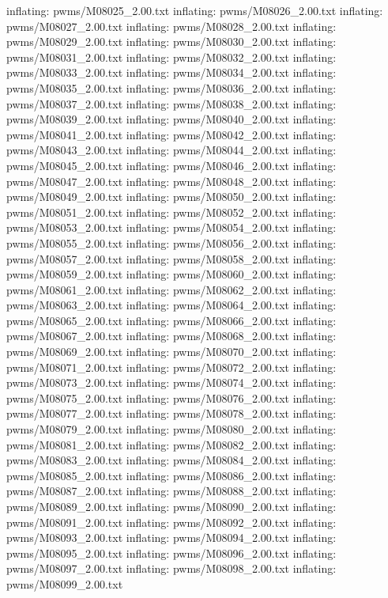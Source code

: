 \documentclass[letterpaper,10pt,english]{sphinxmanual}
\begin{document}
{\begin{sphinxVerbatim}[commandchars=\\\{\}]
  inflating: pwms/M08025\_2.00.txt
  inflating: pwms/M08026\_2.00.txt
  inflating: pwms/M08027\_2.00.txt
  inflating: pwms/M08028\_2.00.txt
  inflating: pwms/M08029\_2.00.txt
  inflating: pwms/M08030\_2.00.txt
  inflating: pwms/M08031\_2.00.txt
  inflating: pwms/M08032\_2.00.txt
  inflating: pwms/M08033\_2.00.txt
  inflating: pwms/M08034\_2.00.txt
  inflating: pwms/M08035\_2.00.txt
  inflating: pwms/M08036\_2.00.txt
  inflating: pwms/M08037\_2.00.txt
  inflating: pwms/M08038\_2.00.txt
  inflating: pwms/M08039\_2.00.txt
  inflating: pwms/M08040\_2.00.txt
  inflating: pwms/M08041\_2.00.txt
  inflating: pwms/M08042\_2.00.txt
  inflating: pwms/M08043\_2.00.txt
  inflating: pwms/M08044\_2.00.txt
  inflating: pwms/M08045\_2.00.txt
  inflating: pwms/M08046\_2.00.txt
  inflating: pwms/M08047\_2.00.txt
  inflating: pwms/M08048\_2.00.txt
  inflating: pwms/M08049\_2.00.txt
  inflating: pwms/M08050\_2.00.txt
  inflating: pwms/M08051\_2.00.txt
  inflating: pwms/M08052\_2.00.txt
  inflating: pwms/M08053\_2.00.txt
  inflating: pwms/M08054\_2.00.txt
  inflating: pwms/M08055\_2.00.txt
  inflating: pwms/M08056\_2.00.txt
  inflating: pwms/M08057\_2.00.txt
  inflating: pwms/M08058\_2.00.txt
  inflating: pwms/M08059\_2.00.txt
  inflating: pwms/M08060\_2.00.txt
  inflating: pwms/M08061\_2.00.txt
  inflating: pwms/M08062\_2.00.txt
  inflating: pwms/M08063\_2.00.txt
  inflating: pwms/M08064\_2.00.txt
  inflating: pwms/M08065\_2.00.txt
  inflating: pwms/M08066\_2.00.txt
  inflating: pwms/M08067\_2.00.txt
  inflating: pwms/M08068\_2.00.txt
  inflating: pwms/M08069\_2.00.txt
  inflating: pwms/M08070\_2.00.txt
  inflating: pwms/M08071\_2.00.txt
  inflating: pwms/M08072\_2.00.txt
  inflating: pwms/M08073\_2.00.txt
  inflating: pwms/M08074\_2.00.txt
  inflating: pwms/M08075\_2.00.txt
  inflating: pwms/M08076\_2.00.txt
  inflating: pwms/M08077\_2.00.txt
  inflating: pwms/M08078\_2.00.txt
  inflating: pwms/M08079\_2.00.txt
  inflating: pwms/M08080\_2.00.txt
  inflating: pwms/M08081\_2.00.txt
  inflating: pwms/M08082\_2.00.txt
  inflating: pwms/M08083\_2.00.txt
  inflating: pwms/M08084\_2.00.txt
  inflating: pwms/M08085\_2.00.txt
  inflating: pwms/M08086\_2.00.txt
  inflating: pwms/M08087\_2.00.txt
  inflating: pwms/M08088\_2.00.txt
  inflating: pwms/M08089\_2.00.txt
  inflating: pwms/M08090\_2.00.txt
  inflating: pwms/M08091\_2.00.txt
  inflating: pwms/M08092\_2.00.txt
  inflating: pwms/M08093\_2.00.txt
  inflating: pwms/M08094\_2.00.txt
  inflating: pwms/M08095\_2.00.txt
  inflating: pwms/M08096\_2.00.txt
  inflating: pwms/M08097\_2.00.txt
  inflating: pwms/M08098\_2.00.txt
  inflating: pwms/M08099\_2.00.txt

\end{sphinxVerbatim}}
\end{document}
